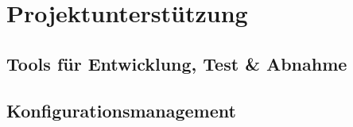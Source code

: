 \section{Projektunterstützung}

\subsection{Tools für Entwicklung, Test \& Abnahme}

\subsection{Konfigurationsmanagement}